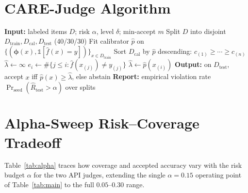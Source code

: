 
\section{CARE-Judge Algorithm}
\label{app:algo}

\begin{algorithm}[h]
\caption{CARE-Judge selective evaluation}
\label{alg:care}
\begin{algorithmic}[1]
\STATE \textbf{Input:} labeled items $D$; risk $\alpha$, level $\delta$; min-accept $m$
\STATE Split $D$ into disjoint $D_{\text{train}}, D_{\text{cal}}, D_{\text{test}}$ (40/30/30)
\STATE Fit calibrator $\hat p$ on $\{(\boldsymbol\phi(x), \mathbb{1}[\hat f(x){=}y])\}_{x\in D_{\text{train}}}$
\STATE Sort $D_{\text{cal}}$ by $\hat p$ descending: $c_{(1)}\ge\cdots\ge c_{(n)}$
\STATE $\hat\lambda \gets \infty$ 
  \STATE $e_i \gets \#\{j\le i: \hat f(x_{(j)})\ne y_{(j)}\}$ 
    \STATE $\hat\lambda \gets \hat p(x_{(i)})$ 
  \ENDIF
\ENDFOR
\STATE \textbf{Output:} on $D_{\text{test}}$, accept $x$ iff $\hat p(x)\ge\hat\lambda$, else abstain
\STATE \textbf{Report:} empirical violation rate $\Pr_{\text{seed}}(\hat R_{\text{test}}>\alpha)$ over splits
\end{algorithmic}
\end{algorithm}

\section{Alpha-Sweep Risk--Coverage Tradeoff}
\label{app:alpha}
Table~\ref{tab:alpha} traces how coverage and accepted accuracy vary with the risk budget $\alpha$ for the two API judges, extending the single $\alpha{=}0.15$ operating point of Table~\ref{tab:main} to the full $0.05$--$0.30$ range.

